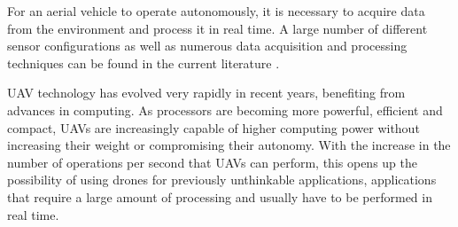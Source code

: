 For an aerial vehicle to operate autonomously, it is necessary to acquire data from the environment and process it in real time. A large number of different sensor configurations as well as numerous data acquisition and processing techniques can be found in the current literature \cite{SenseAndAvoid, aasen2018quantitative, miningSensors}.




\gls{UAV} technology has evolved very rapidly in recent years, benefiting from advances in computing. As processors are becoming more powerful, efficient and compact, \glspl{UAV} are increasingly capable of higher computing power without increasing their weight or compromising their autonomy. With the increase in the number of operations per second that \glspl{UAV} can perform, this opens up the possibility of using drones for previously unthinkable applications, applications that require a large amount of processing and usually have to be performed in real time.

